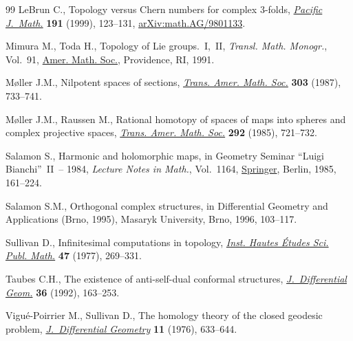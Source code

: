 \documentclass[pdftex]{sigma}%
\numberwithin{equation}{section}
\begin{document}
\begin{thebibliography}{99}
LeBrun C., Topology versus {C}hern numbers for complex {$3$}-folds,
 \href{https://doi.org/10.2140/pjm.1999.191.123}{\textit{Pacific J.~Math.}} \textbf{191} (1999), 123--131,
 \href{https://arxiv.org/abs/math.AG/9801133}{arXiv:math.AG/9801133}.

Mimura M., Toda H., Topology of {L}ie groups.~{I},~{II}, \textit{Transl. Math.
 Monogr.}, Vol.~91, \href{https://doi.org/10.1090/mmono/091}{Amer. Math. Soc.}, Providence, RI, 1991.

M{\o}ller J.M., Nilpotent spaces of sections, \href{https://doi.org/10.2307/2000693}{\textit{Trans. Amer. Math. Soc.}}
 \textbf{303} (1987), 733--741.

M{\o}ller J.M., Raussen M., Rational homotopy of spaces of maps into spheres
 and complex projective spaces, \href{https://doi.org/10.2307/2000242}{\textit{Trans. Amer. Math. Soc.}} \textbf{292}
 (1985), 721--732.

Salamon S., Harmonic and holomorphic maps, in Geometry Seminar ``{L}uigi
 {B}ianchi''~{II}~-- 1984, \textit{Lecture Notes in Math.}, Vol.~1164,
 \href{https://doi.org/10.1007/BFb0081912}{Springer}, Berlin, 1985, 161--224.

Salamon S.M., Orthogonal complex structures, in Differential Geometry and
 Applications ({B}rno, 1995), Masaryk University, Brno, 1996, 103--117.

Sullivan D., Infinitesimal computations in topology, \href{https://doi.org/10.1007/BF02684341}{\textit{Inst. Hautes
 \'Etudes Sci. Publ. Math.}} \textbf{47} (1977), 269--331.

Taubes C.H., The existence of anti-self-dual conformal structures,
 \href{https://doi.org/10.4310/jdg/1214448445}{\textit{J.~Differential Geom.}} \textbf{36} (1992), 163--253.

Vigu\'e-Poirrier M., Sullivan D., The homology theory of the closed geodesic
 problem, \href{https://doi.org/10.4310/jdg/1214433729}{\textit{J.~Differential Geometry}} \textbf{11} (1976), 633--644.

\end{thebibliography}\LastPageEnding
\end{document}
